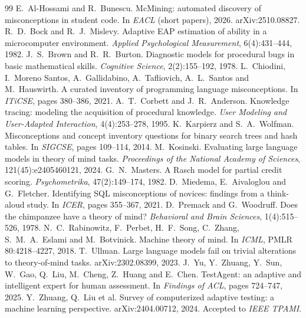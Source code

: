 \documentclass[10pt,a4paper]{article}
\begin{document}
\begin{thebibliography}{99}\footnotesize\setlength{\itemsep}{0pt}\setlength{\parskip}{0pt}
 E.~Al-Hossami and R.~Bunescu. McMining: automated discovery of
  misconceptions in student code. In \emph{EACL} (short papers), 2026. arXiv:2510.08827.
 R.~D.~Bock and R.~J.~Mislevy. Adaptive EAP estimation of ability in a
  microcomputer environment. \emph{Applied Psychological Measurement}, 6(4):431--444, 1982.
 J.~S.~Brown and R.~R.~Burton. Diagnostic models for procedural bugs in basic
  mathematical skills. \emph{Cognitive Science}, 2(2):155--192, 1978.
 L.~Chiodini, I.~Moreno Santos, A.~Gallidabino, A.~Tafliovich, A.~L.~Santos
  and M.~Hauswirth. A curated inventory of programming language misconceptions. In \emph{ITiCSE},
  pages 380--386, 2021.
 A.~T.~Corbett and J.~R.~Anderson. Knowledge tracing: modeling the acquisition
  of procedural knowledge. \emph{User Modeling and User-Adapted Interaction}, 4(4):253--278, 1995.
 K.~Karpierz and S.~A.~Wolfman. Misconceptions and concept inventory
  questions for binary search trees and hash tables. In \emph{SIGCSE}, pages 109--114, 2014.
 M.~Kosinski. Evaluating large language models in theory of mind tasks.
  \emph{Proceedings of the National Academy of Sciences}, 121(45):e2405460121, 2024.
 G.~N.~Masters. A Rasch model for partial credit scoring.
  \emph{Psychometrika}, 47(2):149--174, 1982.
 D.~Miedema, E.~Aivaloglou and G.~Fletcher. Identifying SQL misconceptions of
  novices: findings from a think-aloud study. In \emph{ICER}, pages 355--367, 2021.
 D.~Premack and G.~Woodruff. Does the chimpanzee have a theory of mind?
  \emph{Behavioral and Brain Sciences}, 1(4):515--526, 1978.
 N.~C.~Rabinowitz, F.~Perbet, H.~F.~Song, C.~Zhang, S.~M.~A.~Eslami and
  M.~Botvinick. Machine theory of mind. In \emph{ICML}, PMLR 80:4218--4227, 2018.
 T.~Ullman. Large language models fail on trivial alterations to theory-of-mind
  tasks. arXiv:2302.08399, 2023.
 J.~Yu, Y.~Zhuang, Y.~Sun, W.~Gao, Q.~Liu, M.~Cheng, Z.~Huang and E.~Chen.
  TestAgent: an adaptive and intelligent expert for human assessment. In \emph{Findings of ACL},
  pages 724--747, 2025.
 Y.~Zhuang, Q.~Liu et al. Survey of computerized adaptive testing: a machine
  learning perspective. arXiv:2404.00712, 2024. Accepted to \emph{IEEE TPAMI}.
\end{thebibliography}
\end{document}
